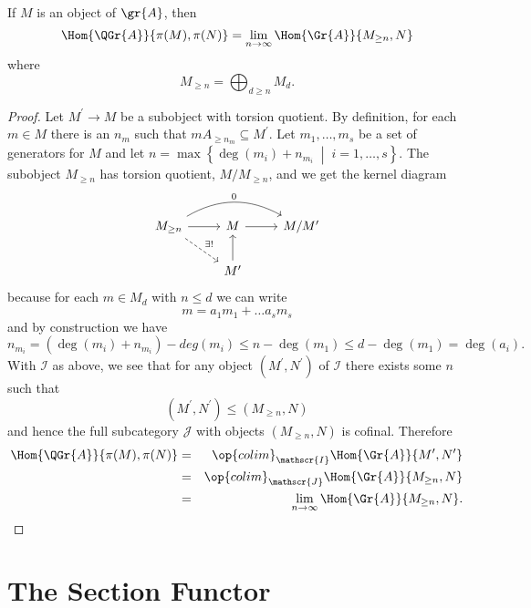 \begin{prop}
  If $M$ is an object of $\gr{A}$, then 
  $$\Hom{\QGr{A}}{\pi(M), \pi(N)} = \lim_{n \rightarrow \infty} \Hom{\Gr{A}}{M_{\geq n}, N}$$
  where 
  $$M_{\geq n} = \bigoplus_{d \geq n} M_d.$$
  \begin{proof}
    Let $M^\prime \rightarrow M$ be a subobject with torsion quotient.
    By definition, for each $m \in M$ there is an $n_m$ such that $mA_{\geq n_m} \subseteq M^\prime$.
    Let $m_1, \ldots, m_s$ be a set of generators for $M$ and let $n = \max\left\{\deg(m_i) + n_{m_i} \;\middle\vert\; i = 1, \ldots , s\right\}$.
    The subobject $M_{\geq n}$ has torsion quotient, $M/M_{\geq n}$, and we get the kernel diagram
    $$\begin{tikzcd}
      M_{\geq n} \arrow[bend left]{rr}{0} \arrow[dashed]{rd}{\exists !}\arrow{r} & M \arrow{r} & M/M^\prime\\
      & M^\prime \arrow{u}
    \end{tikzcd}$$
    because for each $m \in M_{d}$ with $n \leq d$ we can write
    $$m = a_1m_1 + \ldots a_sm_s$$
    and by construction we have
    $$n_{m_i} = (\deg(m_i) + n_{m_i}) - deg(m_i) \leq n - \deg(m_1) \leq d - \deg(m_1) = \deg(a_i).$$
    With $\mathscr{I}$ as above, we see that for any object $(M^\prime, N^\prime)$ of $\mathscr{I}$ there exists some $n$ such that
    $$(M^\prime, N^\prime) \leq (M_{\geq n}, N)$$
    and hence the full subcategory $\mathscr{J}$ with objects $(M_{\geq n}, N)$ is cofinal.
    Therefore
    \begin{eqnarray*}
      \Hom{\QGr{A}}{\pi(M), \pi(N)} &=& \op{colim}_{\mathscr{I}}\Hom{\Gr{A}}{M^\prime, N^\prime}\\
      &=& \op{colim}_{\mathscr{J}}\Hom{\Gr{A}}{M_{\geq n}, N}\\
      &=& \lim_{n \rightarrow \infty} \Hom{\Gr{A}}{M_{\geq n}, N}.
    \end{eqnarray*}
  \end{proof}
\end{prop}

\section{The Section Functor}

